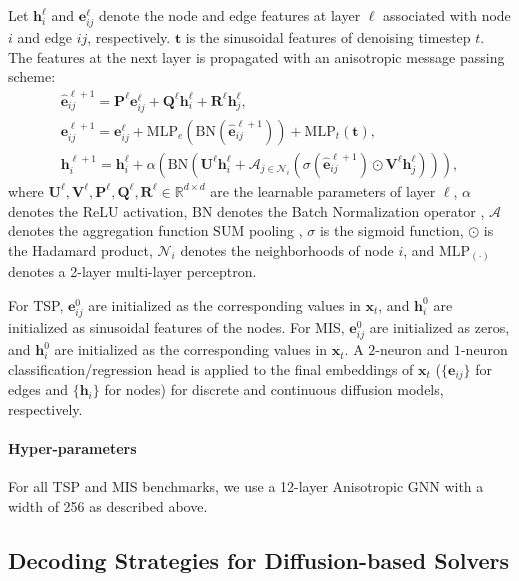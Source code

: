 \documentclass{article}
\theoremstyle{plain}
\theoremstyle{definition}
\theoremstyle{remark}
\newcommand\BM\boldsymbol
\begin{document}
Let $\BM h_i^\ell$ and $\BM e_{ij}^\ell$ denote the node and edge features at layer $\ell$ associated with node $i$ and edge $ij$, respectively. $\mathbf{t}$ is the sinusoidal features \citep{vaswani2017attention} of denoising timestep $t$. The features at the next layer is propagated with an anisotropic message passing scheme:
\begin{gather*}
    \hat{\BM e}^{\ell+1}_{ij} = \BM P^\ell \BM e^\ell_{ij} + \BM Q^\ell \BM h^\ell_i + \BM R^\ell \BM h^\ell_j,\\
    \BM e_{ij}^{\ell+1} = \BM e_{ij}^\ell + \mathrm{MLP}_e(\mathrm{BN}(\hat{\BM e}^{\ell+1}_{ij})) + \mathrm{MLP}_t(\mathbf{t}),\\
    \BM h_i^{\ell+1} = \BM h_i^\ell + \alpha(\mathrm{BN}(\BM U^\ell \BM h_i^\ell+ \mathcal{A}_{j \in \mathcal{N}_i}(\sigma(\hat{\BM e}_{ij}^{\ell+1}) \odot\BM V^\ell\BM  h^\ell_j))),
\end{gather*} 
where $\BM U^\ell,\BM V^\ell,\BM P^\ell,\BM Q^\ell,\BM R^\ell \in \mathbb{R}^{d\times d}$ are the learnable parameters of layer $\ell$, $\alpha$ denotes the $\mathrm{ReLU}$ \citep{krizhevsky2010convolutional} activation, $\mathrm{BN}$ denotes the Batch Normalization operator \citep{batch-norm}, $\mathcal{A}$ denotes the aggregation function $\mathrm{SUM}$ pooling \citep{xu2018how}, $\sigma$ is the sigmoid function, $\odot$ is the Hadamard product, $\mathcal{N}_i$ denotes the neighborhoods of node $i$, and $\mathrm{MLP}_{(\cdot)}$ denotes a 2-layer multi-layer perceptron.


For TSP, $\BM e_{ij}^0$ are initialized as the corresponding values in $\mathbf{x}_t$, and $\BM h_{i}^0$ are initialized as sinusoidal features of the nodes. For MIS, $\BM e_{ij}^0$ are initialized as zeros, and $\BM h_{i}^0$ are initialized as the corresponding values in $\mathbf{x}_t$. A $2$-neuron and $1$-neuron classification/regression head is applied to the final embeddings of $\mathbf{x}_t$ ($\{\mathbf{e}_{ij}\}$ for edges and $\{\mathbf{h}_{i}\}$ for nodes) for discrete and continuous diffusion models, respectively.

\paragraph{Hyper-parameters} For all TSP and MIS benchmarks, we use a 12-layer Anisotropic GNN with a width of 256 as described above.




\subsection{Decoding Strategies for Diffusion-based Solvers} \label{sec:decoding_strategy}
\end{document}
